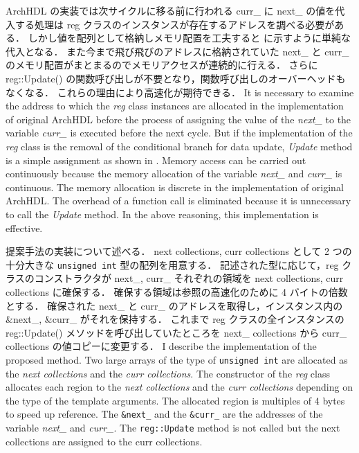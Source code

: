 ArchHDL の実装では次サイクルに移る前に行われる curr\_ に next\_ の値を代入する処理は
reg クラスのインスタンスが存在するアドレスを調べる必要がある．
しかし値を配列として格納しメモリ配置を工夫すると に示すように単純な代入となる．
また今まで飛び飛びのアドレスに格納されていた next\_ と curr\_ のメモリ配置がまとまるのでメモリアクセスが連続的に行える．
さらに reg::Update() の関数呼び出しが不要となり，関数呼び出しのオーバーヘッドもなくなる．
これらの理由により高速化が期待できる．
\fi
It is necessary to examine the address to which the \textit{reg} class instances are allocated in the implementation of original ArchHDL
before the process of assigning the value of the \textit{next\_} to the variable \textit{curr\_} is executed before the next cycle.
But if the implementation of the \textit{reg} class is the removal of the conditional branch for data update, \textit{Update} method is a simple assignment as shown in .
Memory access can be carried out continuously
because the memory allocation of the variable \textit{next\_} and \textit{curr\_} is continuous.
The memory allocation is discrete in the implementation of original ArchHDL.
The overhead of a function call is eliminated
because it is unnecessary to call the \textit{Update} method.
In the above reasoning, this implementation is effective.

提案手法の実装について述べる．
next collections, curr collections として 2 つの十分大きな \verb/unsigned int/ 型の配列を用意する．
記述された型に応じて，reg クラスのコンストラクタが next\_, curr\_ それぞれの領域を next collections, curr collections に確保する．
確保する領域は参照の高速化のために 4 バイトの倍数とする．
確保された next\_ と curr\_ のアドレスを取得し，インスタンス内の \&next\_, \&curr\_ がそれを保持する．
これまで reg クラスの全インスタンスの reg::Update() メソッドを呼び出していたところを next\_ collections から curr\_ collections の値コピーに変更する．
\fi
I describe the implementation of the proposed method.
Two large arrays of the type of \verb/unsigned int/ are allocated as the \textit{next collections} and the \textit{curr collections}.
The constructor of the \textit{reg} class allocates each region to the \textit{next collections} and the \textit{curr collections} depending on the type of the template arguments.
The allocated region is multiples of 4 bytes to speed up reference.
The \texttt{\&next\_} and the \texttt{\&curr\_} are the addresses of the variable \textit{next\_} and \textit{curr\_}.
The \texttt{reg::Update} method is not called
but the next collections are assigned to the curr collections.



